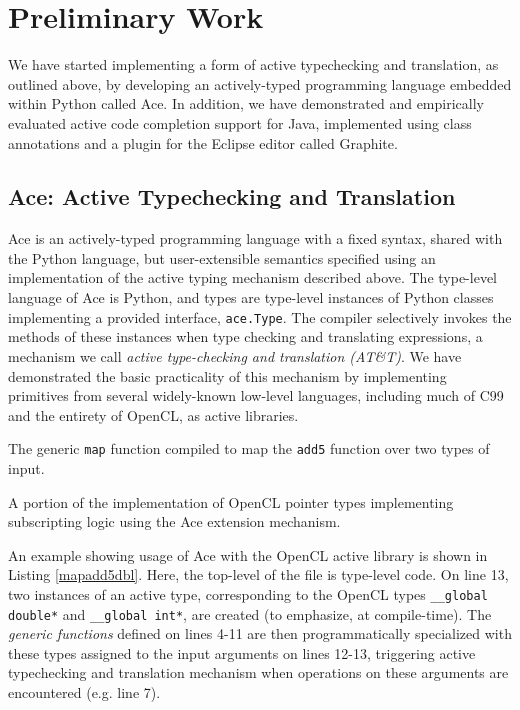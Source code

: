 \section{Preliminary Work}
We have started implementing a form of active typechecking and translation, as outlined above, by developing an actively-typed programming language embedded within Python called Ace. In addition, we have demonstrated and empirically evaluated active code completion support for Java, implemented using class annotations and a  plugin for the Eclipse editor called Graphite.

\subsection{Ace: Active Typechecking and Translation}
Ace is an actively-typed programming language with a fixed syntax, shared with the Python language, but user-extensible semantics specified using an implementation of the active typing mechanism described above. The type-level language of Ace is Python, and types are type-level instances of Python classes implementing a provided interface, \verb|ace.Type|. The compiler selectively invokes the methods of these instances when type checking and translating expressions, a mechanism we call {\em active type-checking and translation (AT\&T)}. We have demonstrated the basic practicality of this mechanism by implementing primitives from several widely-known low-level languages, including much of C99 and the entirety of OpenCL, as active libraries. 
\begin{codelisting}

\caption{The generic \texttt{map} function compiled to map the \texttt{add5} function over two  types of input.}
\label{mapadd5dbl}
\end{codelisting}

\begin{codelisting}

\caption{A portion of the implementation of OpenCL pointer types implementing subscripting logic using the Ace extension mechanism.}
\label{pointers}
\end{codelisting}

An example showing usage of Ace with the OpenCL active library is shown in Listing \ref{mapadd5dbl}. Here, the top-level of the file is type-level code. On line 13, two instances of an active type, corresponding to the OpenCL types \verb|__global double*| and \verb|__global int*|, are created (to emphasize, at compile-time). The \emph{generic functions} defined on lines 4-11 are then programmatically specialized with these types assigned to the input arguments on lines 12-13, triggering active typechecking and translation mechanism when operations on these arguments are encountered (e.g. line 7).

